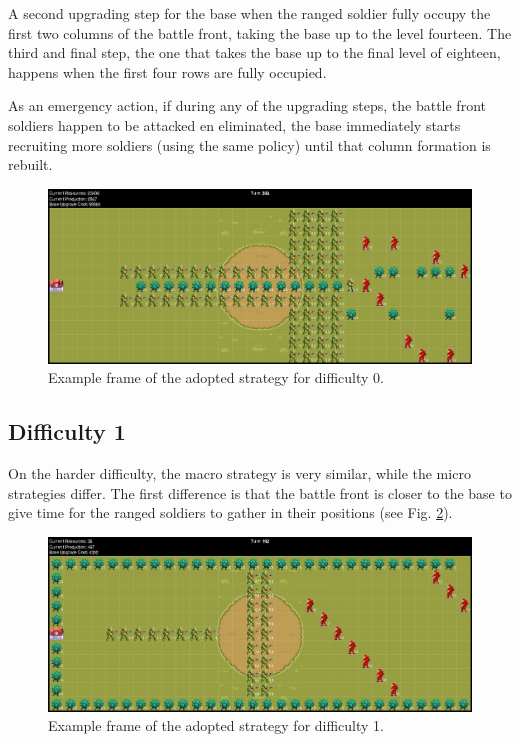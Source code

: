 \documentclass[conference]{IEEEtran}
\begin{document}
A second upgrading step for the base when the ranged soldier fully occupy the first two columns of the battle front, taking the base up to the level fourteen. The third and final step, the one that takes the base up to the final level of eighteen, happens when the first four rows are fully occupied.

As an emergency action, if during any of the upgrading steps, the battle front soldiers happen to be attacked en eliminated, the base immediately starts recruiting more soldiers (using the same policy) until that column formation is rebuilt. 

\begin{figure}[htbp]
    \centering
    \includegraphics[width=\textwidth]{imgs/dif0_formattions.png}
    \caption{Example frame of the adopted strategy for difficulty 0.}
    \label{fig:dif0_formattions}
\end{figure}

\subsection{Difficulty 1}

On the harder difficulty, the macro strategy is very similar, while the micro strategies differ. The first difference is that the battle front is closer to the base to give time for the ranged soldiers to gather in their positions (see Fig. \ref{fig:dif1_formattions}). 

\begin{figure}[htbp]
    \centering
    \includegraphics[width=\textwidth]{imgs/dif1_formattions.png}
    \caption{Example frame of the adopted strategy for difficulty 1.}
    \label{fig:dif1_formattions}
\end{figure}
\end{document}
